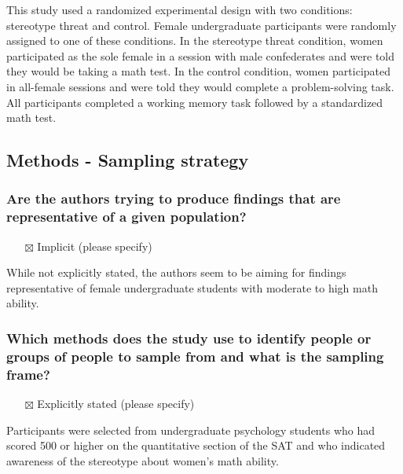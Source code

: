 \documentclass[
  doc, a4paper]{apa7}
\providecommand{\tightlist}{%
  \setlength{\itemsep}{0pt}\setlength{\parskip}{0pt}}
\begin{document}
This study used a randomized experimental design with two conditions: stereotype threat and control. Female undergraduate participants were randomly assigned to one of these conditions. In the stereotype threat condition, women participated as the sole female in a session with male confederates and were told they would be taking a math test. In the control condition, women participated in all-female sessions and were told they would complete a problem-solving task. All participants completed a working memory task followed by a standardized math test.

\subsection{Methods - Sampling strategy}\label{methods---sampling-strategy}

\subsubsection{Are the authors trying to produce findings that are representative of a given population?}\label{are-the-authors-trying-to-produce-findings-that-are-representative-of-a-given-population}

\begin{itemize}
\tightlist
\item[$\boxtimes$]
  Implicit (please specify)
\end{itemize}

While not explicitly stated, the authors seem to be aiming for findings representative of female undergraduate students with moderate to high math ability.

\subsubsection{Which methods does the study use to identify people or groups of people to sample from and what is the sampling frame?}\label{which-methods-does-the-study-use-to-identify-people-or-groups-of-people-to-sample-from-and-what-is-the-sampling-frame}

\begin{itemize}
\tightlist
\item[$\boxtimes$]
  Explicitly stated (please specify)
\end{itemize}

Participants were selected from undergraduate psychology students who had scored 500 or higher on the quantitative section of the SAT and who indicated awareness of the stereotype about women's math ability.
\end{document}
